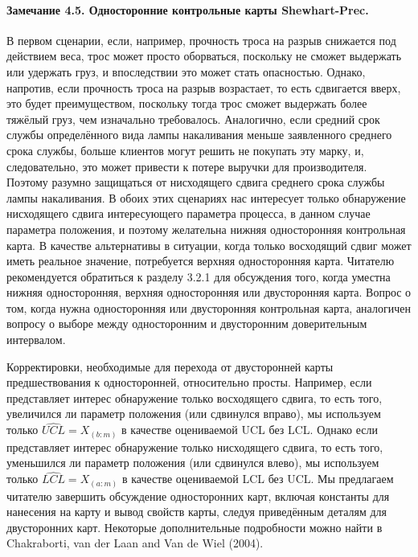 \paragraph{Замечание 4.5. Односторонние контрольные карты Shewhart-Prec.} В первом сценарии, если, например, прочность троса на разрыв снижается под действием веса, трос может просто оборваться, поскольку не сможет выдержать или удержать груз, и впоследствии это может стать опасностью. Однако, напротив, если прочность троса на разрыв возрастает, то есть сдвигается вверх, это будет преимуществом, поскольку тогда трос сможет выдержать более тяжёлый груз, чем изначально требовалось. Аналогично, если средний срок службы определённого вида лампы накаливания меньше заявленного среднего срока службы, больше клиентов могут решить не покупать эту марку, и, следовательно, это может привести к потере выручки для производителя. Поэтому разумно защищаться от нисходящего сдвига среднего срока службы лампы накаливания. В обоих этих сценариях нас интересует только обнаружение нисходящего сдвига интересующего параметра процесса, в данном случае параметра положения, и поэтому желательна нижняя односторонняя контрольная карта. В качестве альтернативы в ситуации, когда только восходящий сдвиг может иметь реальное значение, потребуется верхняя односторонняя карта. Читателю рекомендуется обратиться к разделу 3.2.1 для обсуждения того, когда уместна нижняя односторонняя, верхняя односторонняя или двусторонняя карта. Вопрос о том, когда нужна односторонняя или двусторонняя контрольная карта, аналогичен вопросу о выборе между односторонним и двусторонним доверительным интервалом.

Корректировки, необходимые для перехода от двусторонней карты предшествования к односторонней, относительно просты. Например, если представляет интерес обнаружение только восходящего сдвига, то есть того, увеличился ли параметр положения (или сдвинулся вправо), мы используем только \(\widehat{UCL} = X_{(b:m)}\) в качестве оцениваемой UCL без LCL. Однако если представляет интерес обнаружение только нисходящего сдвига, то есть того, уменьшился ли параметр положения (или сдвинулся влево), мы используем только \(\widehat{LCL} = X_{(a:m)}\) в качестве оцениваемой LCL без UCL. Мы предлагаем читателю завершить обсуждение односторонних карт, включая константы для нанесения на карту и вывод свойств карты, следуя приведённым деталям для двусторонних карт. Некоторые дополнительные подробности можно найти в Chakraborti, van der Laan and Van de Wiel (2004).

